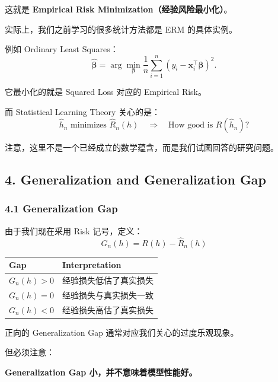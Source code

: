 这就是 \textbf{Empirical Risk Minimization（经验风险最小化）}。

实际上，我们之前学习的很多统计方法都是 ERM 的具体实例。

例如 Ordinary Least Squares：
\[\hat{\boldsymbol\beta}
=
\arg\min_{\boldsymbol\beta}
\frac1n
\sum_{i=1}^{n}
(y_i-\mathbf x_i^\top\boldsymbol\beta)^2.\]

它最小化的就是 Squared Loss 对应的 Empirical Risk。

而 Statistical Learning Theory 关心的是：
\[\boxed{
\hat h_n\text{ minimizes }\widehat R_n(h)
\quad\Longrightarrow\quad
\text{How good is }R(\hat h_n)?
}\]

注意，这里不是一个已经成立的数学蕴含，而是我们试图回答的研究问题。

\hypertarget{part-2-12-0001-generalization-and-generalization-gap}{%
\subsection{4. Generalization and Generalization Gap}\label{part-2-12-0001-generalization-and-generalization-gap}}

\hypertarget{part-2-12-0001-generalization-gap}{%
\subsubsection{4.1 Generalization Gap}\label{part-2-12-0001-generalization-gap}}

由于我们现在采用 Risk 记号，定义：
\[\boxed{
G_n(h)=R(h)-\widehat R_n(h)
}\]

\begin{readertable}
\begin{longtable}[]{@{}
  >{\raggedright\arraybackslash}p{}
  >{\raggedright\arraybackslash}p{}@{}}
\toprule
Gap & Interpretation \\
\midrule
\endhead
\(G_n(h)>0\) & 经验损失低估了真实损失 \\
\(G_n(h)=0\) & 经验损失与真实损失一致 \\
\(G_n(h)<0\) & 经验损失高估了真实损失 \\
\bottomrule
\end{longtable}
\end{readertable}

正向的 Generalization Gap 通常对应我们关心的过度乐观现象。

但必须注意：

\textbf{Generalization Gap 小，并不意味着模型性能好。}

